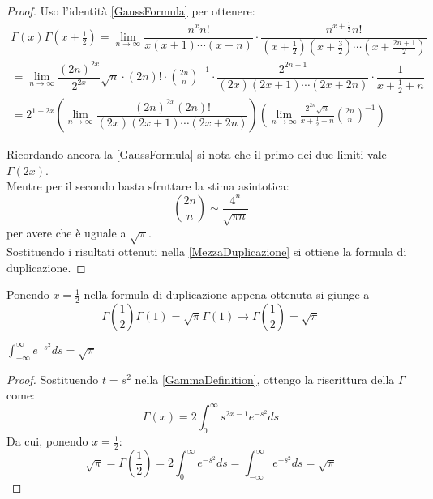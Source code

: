 \begin{proof}
Uso l'identità \cref{GaussFormula} per ottenere:
\begin{equation}
\label{MezzaDuplicazione}
\begin{split}
\Gamma(x)\Gamma\left(x+\frac12\right) = \lim_{n\to\infty} 
\dfrac{n^xn!}{x(x+1)\cdots (x+n)} \cdot \dfrac{n^{x+\frac12} n!}{\left(x+\frac12\right)\left(x+\frac32\right)\cdots \left(x+\frac{2n+1}2\right)}\\
 =\lim_{n\to\infty} \dfrac{(2n)^{2x}}{2^{2x}}\sqrt{n}\cdot (2n)!\cdot\binom{2n}{n}^{-1}\cdot \dfrac{2^{2n+1}}{(2x)(2x+1)\cdots(2x+2n)}\cdot \dfrac{1}{x+\frac12+n} \\
 =2^{1-2x} \left(\lim_{n\to\infty} \dfrac{ (2n)^{2x}(2n)! }{ (2x)(2x+1)\cdots(2x+2n) }\right) 
  \left( \lim_{n\to\infty} \frac{2^{2n}\sqrt{n}}{x+\frac12+n} \binom{2n}{n}^{-1}\right)
\end{split}
\end{equation}

Ricordando ancora la \cref{GaussFormula} si nota che il primo dei due limiti vale $\Gamma(2x)$.\\
Mentre per il secondo basta sfruttare la stima asintotica:
\begin{equation*}
	\binom{2n}{n}\sim \frac{4^n}{\sqrt{\pi n }}
\end{equation*}
per avere che è uguale a $\sqrt{\pi}$.\\
Sostituendo i risultati ottenuti nella \cref{MezzaDuplicazione} si ottiene la formula di duplicazione.
\end{proof}

\begin{remark}
Ponendo $x=\frac12$ nella formula di duplicazione appena ottenuta si giunge a 
\begin{equation*}
  \Gamma\left(\frac12\right)\Gamma(1)=\sqrt{\pi}\Gamma(1) \to \Gamma\left(\frac12\right)=\sqrt{\pi}
\end{equation*}
\end{remark}

\begin{theorem}
 \label{GaussIntegral}
 $\int_{-\infty}^{\infty}{e^{-s^2}ds}=\sqrt{\pi}$
\end{theorem}
\begin{proof}
 Sostituendo $t=s^2$ nella \cref{GammaDefinition}, ottengo la riscrittura della $\Gamma$ come:
 \begin{equation}
  \Gamma(x)=2\int_0^{\infty}{s^{2x-1}e^{-s^2}ds}
 \end{equation}
 Da cui, ponendo $x=\frac{1}{2}$:
 \begin{equation*}
  \sqrt{\pi}=\Gamma\left(\frac{1}{2}\right)=2\int_0^{\infty}{e^{-s^2}ds}=\int_{-\infty}^{\infty}{e^{-s^2}ds}=\sqrt{\pi}
 \end{equation*}


\end{proof}




